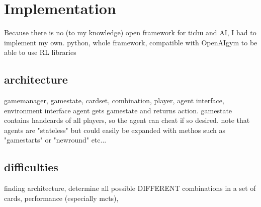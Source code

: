 \chapter{Implementation}
Because there is no (to my knowledge) open framework for tichu and AI, I had to implement my own.
python, whole framework, compatible with OpenAIgym to be able to use RL libraries


\section{architecture}
gamemanager, gamestate, cardset, combination, player, agent interface, environment interface
agent gets gamestate and returns action. gamestate contains handcards of all players, so the agent can cheat if so desired.
note that agents are "stateless" but could easily be expanded with methos such as "gamestarts" or "newround" etc...

\section{difficulties}
finding architecture, determine all possible DIFFERENT combinations in a set of cards, performance (especially mcts),
